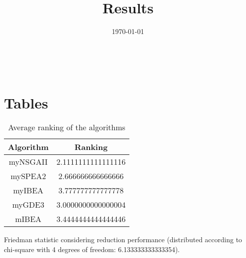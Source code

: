 \documentclass{article}
\title{Results}
\author{}
\date{\today}
\begin{document}
\oddsidemargin 0in \topmargin 0in\maketitle
\
\section{Tables}
\begin{table}[!htp]
\centering
\caption{Average ranking of the algorithms}
\begin{tabular}{c|c}
Algorithm&Ranking\\
\hline
myNSGAII&2.1111111111111116\\
mySPEA2&2.666666666666666\\
myIBEA&3.777777777777778\\
myGDE3&3.0000000000000004\\
mIBEA&3.4444444444444446\\
\end{tabular}
\end{table}


Friedman statistic considering reduction performance (distributed according to chi-square with 4 degrees of freedom: 6.133333333333354).
\end{document}

